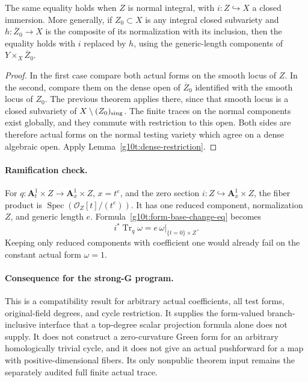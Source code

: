\begin{corollary}
\label{g10t:normal-cycle-base-change}
The same equality holds when $Z$ is normal integral, with
$i:Z\hookrightarrow X$ a closed immersion. More generally,
if $Z_0\subset X$ is any integral closed subvariety and
$h:\overline Z_0\to X$ is the composite of its normalization
with its inclusion, then the equality holds with $i$ replaced
by $h$, using the generic-length components of
$Y\times_X\overline Z_0$.
\end{corollary}

\begin{proof}
In the first case compare both actual forms on the smooth
locus of $Z$. In the second, compare them on the dense open
of $\overline Z_0$ identified with the smooth locus of $Z_0$.
The previous theorem applies there, since that smooth locus
is a closed subvariety of $X\setminus (Z_0)_{\rm sing}$.
The finite traces on the normal components exist globally,
and they commute with restriction to this open. Both sides
are therefore actual forms on the normal testing variety
which agree on a dense algebraic open. Apply
Lemma~\ref{g10t:dense-restriction}.
\end{proof}

\paragraph{Ramification check.}
For $q:\mathbf A^1_t\times Z\to\mathbf A^1_x\times Z$,
$x=t^e$, and the zero section $i:Z\hookrightarrow
\mathbf A^1_x\times Z$, the fiber product is
$\operatorname{Spec}(\mathcal O_Z[t]/(t^e))$. It has one
reduced component, normalization $Z$, and generic length $e$.
Formula~\eqref{g10t:form-base-change-eq} becomes
\[
                i^*\operatorname{Tr}_q\omega
                        =e\,\omega|_{\{t=0\}\times Z}.
\]
Keeping only reduced components with coefficient one would
already fail on the constant actual form $\omega=1$.

\paragraph{Consequence for the strong-G program.}
This is a compatibility result for arbitrary actual coefficients,
all test forms, original-field degrees, and cycle restriction.
It supplies the form-valued branch-inclusive interface that a
top-degree scalar projection formula alone does not supply.
It does not construct a zero-curvature Green form for an
arbitrary homologically trivial cycle, and it does not give
an actual pushforward for a map with positive-dimensional
fibers. Its only nonpublic theorem input remains the separately
audited full finite actual trace.
